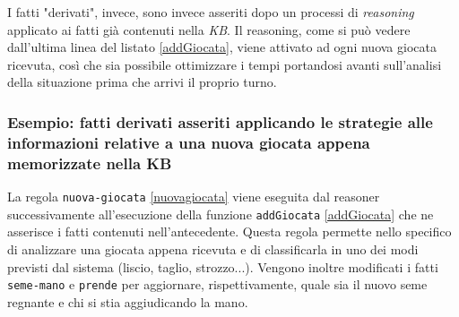 I fatti "derivati", invece, sono invece asseriti dopo un processi di \emph{reasoning} applicato ai fatti già contenuti nella \emph{KB}.
Il reasoning, come si può vedere dall'ultima linea del listato \ref{addGiocata}, viene attivato ad ogni nuova giocata ricevuta, così che sia possibile ottimizzare i tempi portandosi avanti sull'analisi della situazione prima che arrivi il proprio turno.\\

\subsubsection*{Esempio: fatti derivati asseriti applicando le strategie alle informazioni relative a una nuova giocata appena memorizzate nella KB}

La regola \texttt{nuova-giocata} \ref{nuovagiocata} viene eseguita dal reasoner successivamente all'esecuzione della funzione \texttt{addGiocata} \ref{addGiocata} che ne asserisce i fatti contenuti nell'antecedente.
Questa regola permette nello specifico di analizzare una giocata appena ricevuta e di classificarla in uno dei modi previsti dal sistema (liscio, taglio, strozzo...).
Vengono inoltre modificati i fatti \texttt{seme-mano} e \texttt{prende} per aggiornare, rispettivamente, quale sia il nuovo seme regnante e chi si stia aggiudicando la mano.

\lstset{numbers=left, numberstyle=\tiny, stepnumber=1,firstnumber=1,
  numbersep=5pt,language=Lisp,
stringstyle=\ttfamily,
basicstyle=\footnotesize, 
showstringspaces=false,
breaklines=true
}



